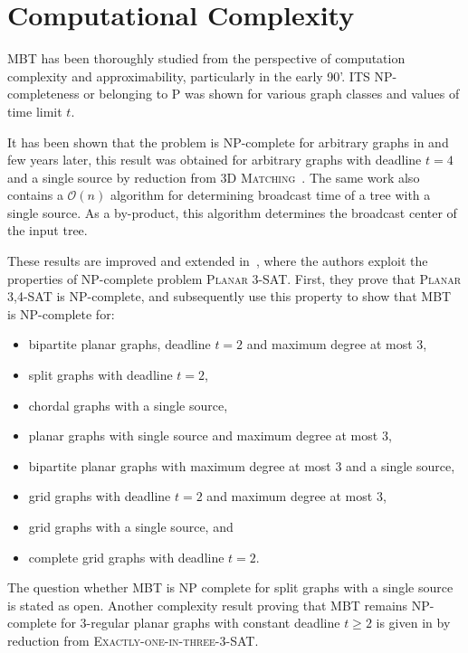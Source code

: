 
\section{Computational Complexity}

MBT has been thoroughly studied from the perspective of computation complexity and approximability, particularly in the early 90'.
ITS NP-completeness or belonging to P was shown for various graph classes and values of time limit $t$.

It has been shown that the problem is NP-complete for arbitrary graphs in \cite{garey79} and few years later, 
this result was obtained for arbitrary graphs with deadline $t=4$ and a single source by reduction from \textsc{3D Matching}~\cite{slater81}. 
The same work also contains a $\mathcal{O}(n)$ algorithm for determining broadcast time of a tree with a single source. 
As a by-product, this algorithm determines the broadcast center of the input tree.

These results are improved and extended in~\cite{jansen93}, where the authors exploit the properties of NP-complete problem \textsc{Planar 3-SAT}.
First, they prove that \textsc{Planar 3,4-SAT} is NP-complete, and subsequently use this property to show that MBT is NP-complete for:
\begin{itemize}
\item bipartite planar graphs, deadline $t=2$ and maximum degree at most 3,
\item split graphs with deadline $t=2$,
\item chordal graphs with a single source, 
\item planar graphs with single source and maximum degree at most 3, 
\item bipartite planar graphs with maximum degree at most 3 and a single source,
\item grid graphs with deadline $t=2$ and maximum degree at most 3,
\item grid graphs with a single source, and
\item complete grid graphs with deadline $t=2$. 
\end{itemize}
The question whether MBT is NP complete for split graphs with a single source is stated as open.
Another complexity result proving that MBT remains NP-complete for 3-regular planar graphs with constant deadline $t\geq 2$ 
is given in \cite{middendorf93} by reduction from \textsc{Exactly-one-in-three-3-SAT}.

